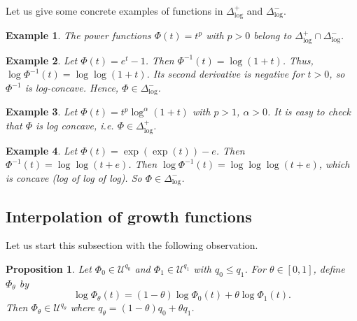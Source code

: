 \documentclass[12pt]{amsart}
\newtheorem{proposition}{Proposition}
\newtheorem{example}{Example}
\newcommand{\U}{\mathcal{U}}
\begin{document}
Let us give some concrete examples of functions in $\Delta_{\log}^+$ and $\Delta_{\log}^-$.

\begin{example}
The power functions $\Phi(t) = t^p$ with $p>0$ belong to $\Delta_{\log}^+\cap \Delta_{\log}^-$.
\end{example}

\begin{example}
Let $\Phi(t) = e^t - 1$. Then $\Phi^{-1}(t) = \log(1+t)$. Thus, $\log\Phi^{-1}(t) = \log\log(1+t)$. Its second derivative is negative for $t>0$, so $\Phi^{-1}$ is log-concave. Hence,  $\Phi\in\Delta_{\log}^-$.
\end{example}

\begin{example}
Let $\Phi(t) = t^p \log^\alpha(1+t)$ with $p>1$, $\alpha>0$. It is easy to check that $\Phi$ is log concave, i.e. $\Phi\in \Delta_{\log}^+$.
\end{example}

\begin{example}
Let $\Phi(t) = \exp(\exp(t))-e$. Then $\Phi^{-1}(t) = \log\log(t+e)$. Then $\log\Phi^{-1}(t) = \log\log\log(t+e)$, which is concave (log of log of log). So $\Phi\in\Delta_{\log}^-$. 
\end{example}
\subsection{Interpolation of growth functions}
Let us start this subsection with the following observation.
\begin{proposition}\label{prop:interp}
Let $\Phi_0\in\U^{q_0}$ and $\Phi_1\in\U^{q_1}$ with $q_0\le q_1$. For
$\theta\in[0,1]$, define $\Phi_\theta$ by
\[
\log\Phi_\theta(t)=(1-\theta)\log\Phi_0(t)+\theta\log\Phi_1(t).
\]
Then $\Phi_\theta\in\U^{q_\theta}$ where $q_\theta=(1-\theta)q_0+\theta q_1$.
\end{proposition}
\end{document}

